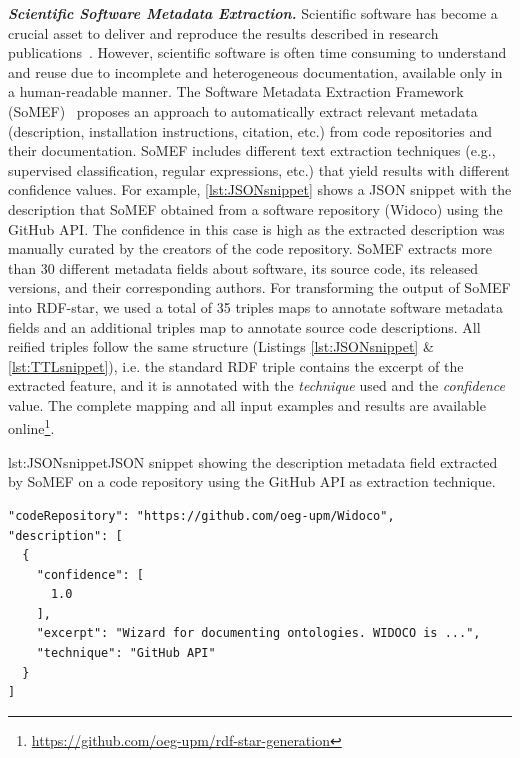 
\noindent\textbf{\textit{Scientific Software Metadata Extraction.}}
Scientific software has become a crucial asset to deliver and reproduce the results described in research publications~\citep{chue_hong_fair_2021}. However, scientific software is often time consuming to understand and reuse due to incomplete and heterogeneous documentation, available only in a human-readable manner.
The Software Metadata Extraction Framework (SoMEF)~\citep{somef} proposes an approach to automatically extract relevant metadata (description, installation instructions, citation, etc.) from code repositories and their documentation. SoMEF includes different text extraction techniques (e.g., supervised classification, regular expressions, etc.) that yield results with different confidence values.
For example, \cref{lst:JSONsnippet} shows a JSON snippet with the description that SoMEF obtained from a software repository (Widoco) using the GitHub API.
The confidence in this case is high as the extracted description was manually curated by the creators of the code repository.
SoMEF extracts more than 30 different metadata fields about 
software, its source code, its released versions, and their corresponding authors. For transforming the output of SoMEF into RDF-star, we used a total of 35 triples maps to annotate software metadata fields and an additional triples map to annotate source code descriptions. All reified triples follow the same structure (Listings \ref{lst:JSONsnippet} \& \ref{lst:TTLsnippet}), i.e. the standard RDF triple contains the excerpt of the extracted feature, and it is annotated
with the \emph{technique} used and the \emph{confidence} value. 
The complete mapping and all input examples and results are available online\footnote{\url{https://github.com/oeg-upm/rdf-star-generation}}.
 
\noindent\hspace{0.1\linewidth}\begin{minipage}{0.8\linewidth}
\begin{captionedlisting}{lst:JSONsnippet}{JSON snippet showing the description metadata field extracted by SoMEF on a code repository using the GitHub API as extraction technique.}
\centering
\hspace{3em}
{
\begin{lstlisting}[basicstyle=\ttfamily\small,label={list:example1},columns=flexible]
"codeRepository": "https://github.com/oeg-upm/Widoco",
"description": [ 
  {
    "confidence": [
      1.0
    ],
    "excerpt": "Wizard for documenting ontologies. WIDOCO is ...",
    "technique": "GitHub API"
  }
]  
\end{lstlisting}
}
\end{captionedlisting}
\end{minipage}

